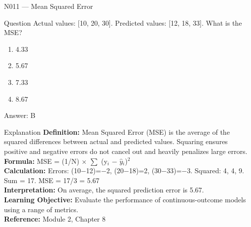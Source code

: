 \documentclass[aspectratio=169,8pt]{beamer}
\begin{document}
	\begin{frame}{N011 --- Mean Squared Error}
		\begin{block}{Question}
			Actual values: [10, 20, 30]. Predicted values: [12, 18, 33]. What is the MSE?
			\begin{enumerate}
				\item 4.33
				\item 5.67
				\item 7.33
				\item 8.67
			\end{enumerate}
		\end{block}
		\begin{exampleblock}{Answer: B}\end{exampleblock}
		\begin{block}{Explanation}
			\textbf{Definition:} Mean Squared Error (MSE) is the average of the squared differences between actual and predicted values. Squaring ensures positive and negative errors do not cancel out and heavily penalizes large errors.\\
			\textbf{Formula:} MSE = (1/N) $\times$ $\sum$ (y$_{i}$ $-$ $\hat{y}$$_{i}$)$^{2}$\\
			\textbf{Calculation:} Errors: (10$-$12)=$-$2, (20$-$18)=2, (30$-$33)=$-$3. Squared: 4, 4, 9. Sum = 17. MSE = 17/3 = 5.67\\
			\textbf{Interpretation:} On average, the squared prediction error is 5.67.\\
			\textbf{Learning Objective:} Evaluate the performance of continuous-outcome models using a range of metrics.\\
			\textbf{Reference:} Module 2, Chapter 8
		\end{block}
	\end{frame}
	
\end{document}
